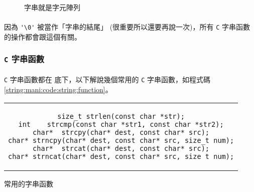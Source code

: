 \documentclass[12pt,a4paper,oneside]{article}
\begin{document}
\begin{CJK}{UTF8}{bkai}
\begin{figure}[h!]
  \centering
  \caption{字串就是字元陣列}
  \label{string:mani:fig:char:array}
\end{figure}

\paragraph{}因為 \lstinline!'\0'! 被當作「字串的結尾」 (很重要所以還要再說一次)，所有 \texttt{C} 字串函數的操作都會跟這個有關。

\subsubsection{\texttt{C} 字串函數}

\paragraph{}\texttt{C} 字串函數都在  底下，以下解說幾個常用的 \texttt{C} 字串函數，如程式碼 \ref{string:mani:code:string:function}。

\begin{code}[h!]
  \centering
  \begin{tabular}{c}
  \begin{lstlisting}
size_t strlen(const char *str);
int    strcmp(const char *str1, const char *str2);
char*  strcpy(char* dest, const char* src);
char* strncpy(char* dest, const char* src, size_t num);
char*  strcat(char* dest, const char* src);
char* strncat(char* dest, const char* src, size_t num);
  \end{lstlisting}
  \end{tabular}
  \caption{常用的字串函數}
  \label{string:mani:code:string:function}
\end{code}


\end{CJK}
\end{document}
